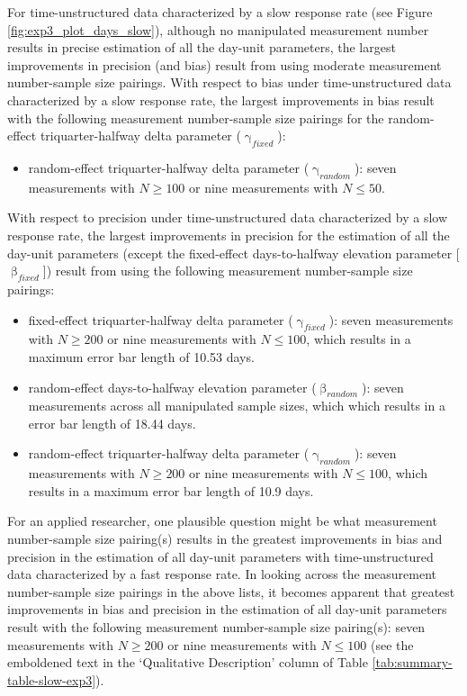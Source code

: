 \documentclass[
12pt, %
twoside,
english]{guelphthesis}
\begin{document}
For time-unstructured data characterized by a slow response rate (see Figure \ref{fig:exp3_plot_days_slow}), although no manipulated measurement number results in precise estimation of all the day-unit parameters, the largest improvements in precision (and bias) result from using moderate measurement number-sample size pairings. With respect to bias under time-unstructured data characterized by a slow response rate, the largest improvements in bias result with the following measurement number-sample size pairings for the random-effect triquarter-halfway delta parameter (\(\upgamma_{fixed}\)):
\begin{itemize}
\tightlist
\item
  random-effect triquarter-halfway delta parameter (\(\upgamma_{random}\)): seven measurements with \(N \ge 100\) or nine measurements with \(N \le 50\).
\end{itemize}
\noindent With respect to precision under time-unstructured data characterized by a slow response rate, the largest improvements in precision for the estimation of all the day-unit parameters (except the fixed-effect days-to-halfway elevation parameter {[}\(\upbeta_{fixed}\){]}) result from using the following measurement number-sample size pairings:
\begin{itemize}
\tightlist
\item
  fixed-effect triquarter-halfway delta parameter (\(\upgamma_{fixed}\)): seven measurements with \(N \ge 200\) or nine measurements with \(N \le 100\), which results in a maximum error bar length of 10.53 days.
\item
  random-effect days-to-halfway elevation parameter (\(\upbeta_{random}\)): seven measurements across all manipulated sample sizes, which which results in a error bar length of 18.44 days.
\item
  random-effect triquarter-halfway delta parameter (\(\upgamma_{random}\)): seven measurements with \(N \ge 200\) or nine measurements with \(N \le 100\), which results in a maximum error bar length of 10.9 days.
\end{itemize}
For an applied researcher, one plausible question might be what measurement number-sample size pairing(s) results in the greatest improvements in bias and precision in the estimation of all day-unit parameters with time-unstructured data characterized by a fast response rate. In looking across the measurement number-sample size pairings in the above lists, it becomes apparent that greatest improvements in bias and precision in the estimation of all day-unit parameters result with the following measurement number-sample size pairing(s): seven measurements with \(N \ge 200\) or nine measurements with \(N \le 100\) (see the emboldened text in the `Qualitative Description' column of Table \ref{tab:summary-table-slow-exp3}).
\end{document}
